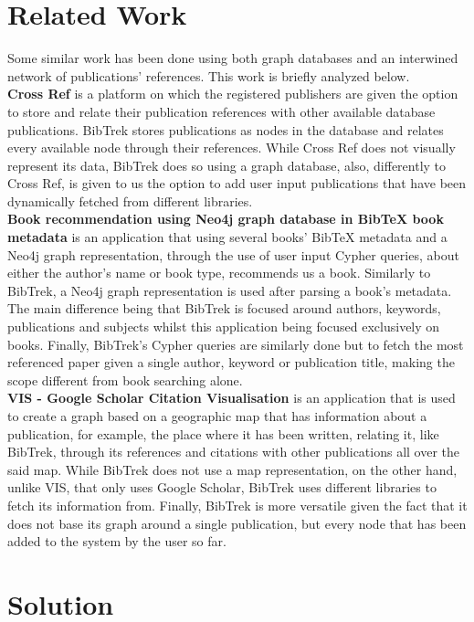 \documentclass[twocolumn]{article}
\begin{document}
\section{Related Work}
Some similar work has been done using both graph databases and an interwined network of publications' references. This work is briefly analyzed below.\\[1\baselineskip]
\textbf{Cross Ref} \cite{crossref} is a platform on which the registered publishers are given the option to store and relate their publication references with other available database publications. BibTrek stores publications as nodes in the database and relates every available node through their references. While Cross Ref does not visually represent its data, BibTrek does so using a graph database, also, differently to Cross Ref, is given to us the option to add user input publications that have been dynamically fetched from different libraries.\\[1\baselineskip]
\textbf{Book recommendation using Neo4j graph database in BibTeX book metadata} \cite{bookrecusingneo4j} is an application that using several books' BibTeX metadata and a Neo4j graph representation, through the use of user input Cypher queries, about either the author's name or book type, recommends us a book. Similarly to BibTrek, a Neo4j graph representation is used after parsing a book's metadata. The main difference being that BibTrek is focused around authors, keywords, publications and subjects whilst this application being focused exclusively on books. Finally, BibTrek's Cypher queries are similarly done but to fetch the most referenced paper given a single author, keyword or publication title, making the scope different from book searching alone.\\[1\baselineskip]
\textbf{VIS - Google Scholar Citation Visualisation} \cite{vis} is an application that is used to create a graph based on a geographic map that has information about a publication, for example, the place where it has been written, relating it, like BibTrek, through its references and citations with other publications all over the said map. While BibTrek does not use a map representation, on the other hand, unlike VIS, that only uses Google Scholar, BibTrek uses different libraries to fetch its information from. Finally, BibTrek is more versatile given the fact that it does not base its graph around a single publication, but every node that has been added to the system by the user so far.

\section{Solution}
\end{document}
